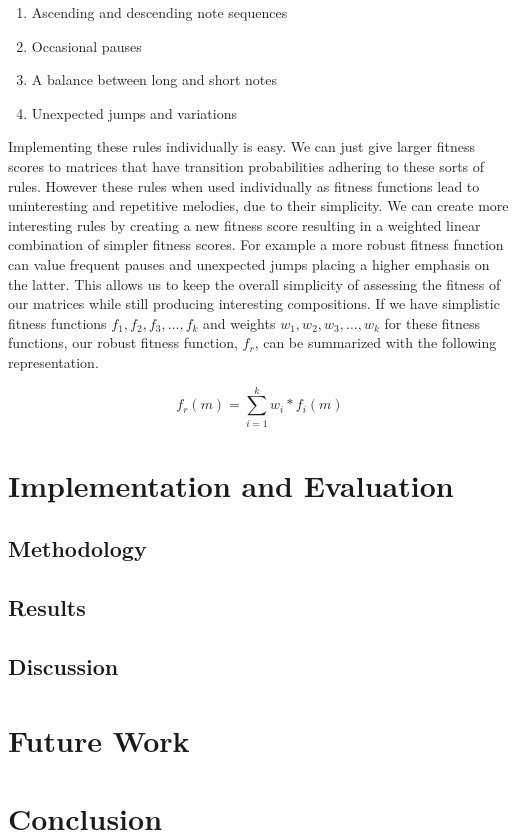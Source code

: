 \documentclass{article}
\begin{document}
\begin{enumerate}
\item Ascending and descending note sequences
\item Occasional pauses
\item A balance between long and short notes
\item Unexpected jumps and variations
\end{enumerate}

Implementing these rules individually is easy. We can just give larger fitness scores to matrices that have transition probabilities adhering to these sorts of rules. However these rules when used individually as fitness functions lead to uninteresting and repetitive melodies, due to their simplicity. We can create more interesting rules by creating a new fitness score resulting in a weighted linear combination of simpler fitness scores. For example a more robust fitness function can value frequent pauses and unexpected jumps placing a higher emphasis on the latter.  This allows us to keep the overall simplicity of assessing the fitness of our matrices while still producing interesting compositions. If we have simplistic fitness functions $f_1, f_2, f_3, ..., f_k$ and weights $w_1, w_2, w_3, ..., w_k$ for these fitness functions, our robust fitness function, $f_r$, can be summarized with the following representation.

\[
f_r(m) = \sum_{i = 1}^k{w_i * f_i (m)}
\]

\section{Implementation and Evaluation}

\subsection{Methodology}
\subsection{Results}
\subsection{Discussion}

\section{Future Work}

\section{Conclusion}
\end{document}
